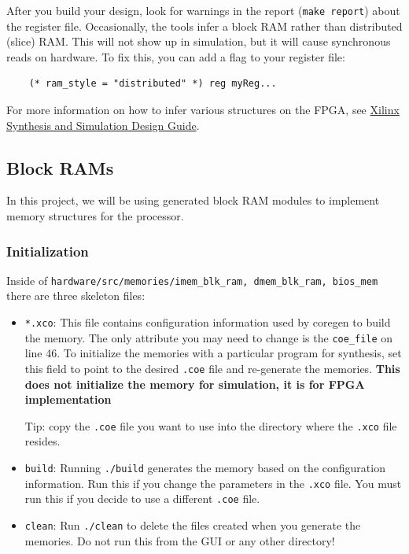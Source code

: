 \documentclass[11pt]{article}
\begin{document}
After you build your design, look for warnings in the report (\verb|make report|) about the register file. Occasionally, the tools infer a block RAM rather than distributed (slice) RAM. This will not show up in simulation, but it will cause synchronous reads on hardware. To fix this, you can add a flag
to your register file:

\begin{verbatim}
	(* ram_style = "distributed" *) reg myReg...
\end{verbatim}

For more information on how to infer various structures on the FPGA, see
\href{http://www.xilinx.com/itp/xilinx10/books/docs/sim/sim.pdf}{Xilinx Synthesis and Simulation Design Guide}.

\subsection{Block RAMs}
\label{ram_info}

In this project, we will be using generated block RAM modules to implement memory structures for the processor.

\subsubsection{Initialization}

Inside of \verb|hardware/src/memories/imem_blk_ram, dmem_blk_ram, bios_mem| there are three skeleton files:
\begin{itemize}
	\item \verb|*.xco|: This file contains configuration information
	used by coregen to build the memory. The only attribute you may need to change is the \verb|coe_file| on line 46. To initialize the memories with a particular program for synthesis, set this field to point to the desired \verb|.coe| file and re-generate the memories. \textbf{This does not initialize the memory for simulation, it is for FPGA implementation}
	
	Tip: copy the \verb|.coe| file you want to use into the directory where the \verb|.xco| file resides.
	
	\item \verb|build|: Running \verb|./build| generates the memory based on the configuration information. Run this if you change the parameters in the \verb|.xco| file. You must run this if you decide to use a different \verb|.coe| file.
	
	\item \verb|clean|: Run \verb|./clean| to delete the files created when	you generate the memories. Do not run this from the GUI or any other	directory!
\end{itemize}
\end{document}
